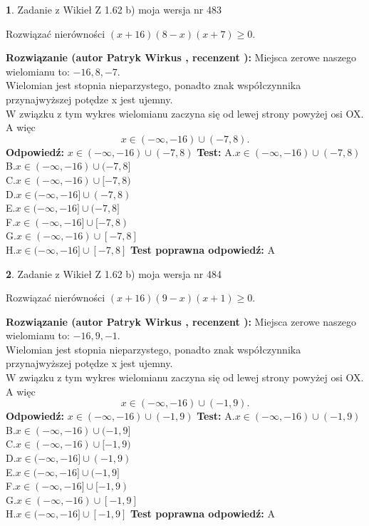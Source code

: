 \documentclass[12pt, a4paper]{article}
\theoremstyle{definition} %
\newtheorem{zad}{}
\newcommand{\zadStart}[1]{\begin{zad}#1\newline}
\newcommand{\zadStop}{\end{zad}}
\newcommand{\rozwStart}[2]{\noindent \textbf{Rozwiązanie (autor #1 , recenzent #2): }\newline}
\newcommand{\rozwStop}{\newline}
\newcommand{\odpStart}{\noindent \textbf{Odpowiedź:}\newline}
\newcommand{\odpStop}{\newline}
\newcommand{\testStart}{\noindent \textbf{Test:}\newline}
\newcommand{\testStop}{\newline}
\newcommand{\kluczStart}{\noindent \textbf{Test poprawna odpowiedź:}\newline}
\newcommand{\kluczStop}{\newline}
\begin{document}
\zadStart{Zadanie z Wikieł Z 1.62 b) moja wersja nr 483}

Rozwiązać nierówności $(x+16)(8-x)(x+7)\ge0$.
\zadStop
\rozwStart{Patryk Wirkus}{}
Miejsca zerowe naszego wielomianu to: $-16, 8, -7$.\\
Wielomian jest stopnia nieparzystego, ponadto znak współczynnika przy\linebreak najwyższej potędze x jest ujemny.\\ W związku z tym wykres wielomianu zaczyna się od lewej strony powyżej osi OX. A więc $$x \in (-\infty,-16) \cup (-7,8).$$
\rozwStop
\odpStart
$x \in (-\infty,-16) \cup (-7,8)$
\odpStop
\testStart
A.$x \in (-\infty,-16) \cup (-7,8)$\\
B.$x \in (-\infty,-16) \cup (-7,8]$\\
C.$x \in (-\infty,-16) \cup [-7,8)$\\
D.$x \in (-\infty,-16] \cup (-7,8)$\\
E.$x \in (-\infty,-16] \cup (-7,8]$\\
F.$x \in (-\infty,-16] \cup [-7,8)$\\
G.$x \in (-\infty,-16) \cup [-7,8]$\\
H.$x \in (-\infty,-16] \cup [-7,8]$
\testStop
\kluczStart
A
\kluczStop



\zadStart{Zadanie z Wikieł Z 1.62 b) moja wersja nr 484}

Rozwiązać nierówności $(x+16)(9-x)(x+1)\ge0$.
\zadStop
\rozwStart{Patryk Wirkus}{}
Miejsca zerowe naszego wielomianu to: $-16, 9, -1$.\\
Wielomian jest stopnia nieparzystego, ponadto znak współczynnika przy\linebreak najwyższej potędze x jest ujemny.\\ W związku z tym wykres wielomianu zaczyna się od lewej strony powyżej osi OX. A więc $$x \in (-\infty,-16) \cup (-1,9).$$
\rozwStop
\odpStart
$x \in (-\infty,-16) \cup (-1,9)$
\odpStop
\testStart
A.$x \in (-\infty,-16) \cup (-1,9)$\\
B.$x \in (-\infty,-16) \cup (-1,9]$\\
C.$x \in (-\infty,-16) \cup [-1,9)$\\
D.$x \in (-\infty,-16] \cup (-1,9)$\\
E.$x \in (-\infty,-16] \cup (-1,9]$\\
F.$x \in (-\infty,-16] \cup [-1,9)$\\
G.$x \in (-\infty,-16) \cup [-1,9]$\\
H.$x \in (-\infty,-16] \cup [-1,9]$
\testStop
\kluczStart
A
\kluczStop
\end{document}
